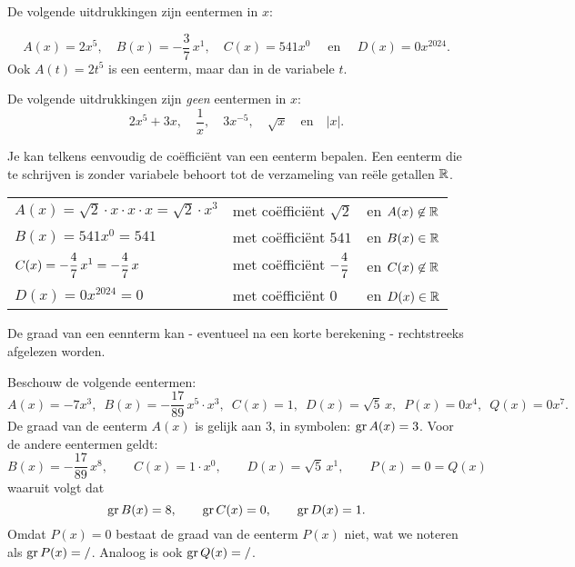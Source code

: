\documentclass{ximera}
\begin{document}
\begin{example} 
De volgende uitdrukkingen zijn eentermen in \(x\):
	
\[
A(x) = 2x^5, 
\quad B(x) = -\frac{3}{7}\,x^1, 
\quad C(x) = 541x^0 \quad \text{ en } 
\quad D(x) = 0x^{2024}.
\]
Ook \(A(t) = 2t^5\) is een eenterm, maar dan in de variabele \(t\). 
\end{example}

\begin{example}
De volgende uitdrukkingen zijn \textit{geen} eentermen in \(x\):
\[
2x^5+3x, 
\quad \frac{1}{x}, 
\quad 3x^{-5}, 
\quad \sqrt{x} 
\quad \text{en} \quad \left|x\right|.
\] 
\end{example} 



Je kan telkens eenvoudig de coëfficiënt van een eenterm bepalen. Een eenterm die te schrijven is zonder variabele behoort tot de verzameling van reële getallen \(\mathbb{R}\). 



\begin{example} 
\begin{tabular}{lll}
 \(A(x) = \sqrt{2}\cdot x \cdot x \cdot x = \sqrt{2}\cdot x^3\)  & met coëfficiënt \(\sqrt{2}\)         & en \(A(x) \not\in \mathbb{R}\) \\
 \(B(x) = 541x^0 = 541\)                                         & met coëfficiënt \(541\)              & en \(B(x) \in \mathbb{R}\)  \\
 \(\displaystyle C(x) = -\frac{4}{7}\,x^1 = -\frac{4}{7}\,x\)               & met coëfficiënt \(\displaystyle -\frac{4}{7}\)  & en \(C(x) \not\in \mathbb{R}\) \\
 \(D(x) = 0 x^{2024} = 0\)                                       & met coëfficiënt \(0\)                & en \(D(x) \in \mathbb{R}\)  \\
\end{tabular}
\end{example} 


De graad van een eennterm kan - eventueel na een korte berekening - rechtstreeks afgelezen worden. 

\begin{example} 
Beschouw de volgende eentermen:
\[
A(x) = -7x^3, \,\,\, B(x) = -\frac{17}{89}\,x^5\cdot x^3, \,\,\, C(x) = 1, \,\,\, D(x) = \sqrt{5}\,x, \,\,\, P(x) = 0 x^4, \,\,\,  Q(x) = 0 x^7.
\]
De graad van de eenterm \(A(x)\) is gelijk aan \(3\), in symbolen: \(\operatorname{gr} A(x) = 3\). 
Voor de andere eentermen geldt:  
\[
B(x) = -\frac{17}{89}\,x^8, \qquad C(x) = 1\cdot x^0, \qquad D(x) = \sqrt{5}\,x^1, \qquad P(x) = 0 = Q(x)
\]
waaruit volgt dat
\[
\operatorname{gr} B(x) = 8, \qquad \operatorname{gr} C(x) = 0, \qquad \operatorname{gr} D(x) = 1. 
\]
Omdat \(P(x) = 0\) bestaat de graad van de eenterm \(P(x)\) niet, wat we noteren als \(\operatorname{gr} P(x) = /\). Analoog is ook \(\operatorname{gr} Q(x) = /\).
\end{example} 
\end{document}
